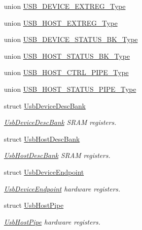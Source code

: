 \begin{DoxyCompactItemize}
\item 
union \hyperlink{union_u_s_b___d_e_v_i_c_e___e_x_t_r_e_g___type}{U\+S\+B\+\_\+\+D\+E\+V\+I\+C\+E\+\_\+\+E\+X\+T\+R\+E\+G\+\_\+\+Type}
\item 
union \hyperlink{union_u_s_b___h_o_s_t___e_x_t_r_e_g___type}{U\+S\+B\+\_\+\+H\+O\+S\+T\+\_\+\+E\+X\+T\+R\+E\+G\+\_\+\+Type}
\item 
union \hyperlink{union_u_s_b___d_e_v_i_c_e___s_t_a_t_u_s___b_k___type}{U\+S\+B\+\_\+\+D\+E\+V\+I\+C\+E\+\_\+\+S\+T\+A\+T\+U\+S\+\_\+\+B\+K\+\_\+\+Type}
\item 
union \hyperlink{union_u_s_b___h_o_s_t___s_t_a_t_u_s___b_k___type}{U\+S\+B\+\_\+\+H\+O\+S\+T\+\_\+\+S\+T\+A\+T\+U\+S\+\_\+\+B\+K\+\_\+\+Type}
\item 
union \hyperlink{union_u_s_b___h_o_s_t___c_t_r_l___p_i_p_e___type}{U\+S\+B\+\_\+\+H\+O\+S\+T\+\_\+\+C\+T\+R\+L\+\_\+\+P\+I\+P\+E\+\_\+\+Type}
\item 
union \hyperlink{union_u_s_b___h_o_s_t___s_t_a_t_u_s___p_i_p_e___type}{U\+S\+B\+\_\+\+H\+O\+S\+T\+\_\+\+S\+T\+A\+T\+U\+S\+\_\+\+P\+I\+P\+E\+\_\+\+Type}
\item 
struct \hyperlink{struct_usb_device_desc_bank}{Usb\+Device\+Desc\+Bank}
\begin{DoxyCompactList}\small\item\em \hyperlink{struct_usb_device_desc_bank}{Usb\+Device\+Desc\+Bank} S\+R\+A\+M registers. \end{DoxyCompactList}\item 
struct \hyperlink{struct_usb_host_desc_bank}{Usb\+Host\+Desc\+Bank}
\begin{DoxyCompactList}\small\item\em \hyperlink{struct_usb_host_desc_bank}{Usb\+Host\+Desc\+Bank} S\+R\+A\+M registers. \end{DoxyCompactList}\item 
struct \hyperlink{struct_usb_device_endpoint}{Usb\+Device\+Endpoint}
\begin{DoxyCompactList}\small\item\em \hyperlink{struct_usb_device_endpoint}{Usb\+Device\+Endpoint} hardware registers. \end{DoxyCompactList}\item 
struct \hyperlink{struct_usb_host_pipe}{Usb\+Host\+Pipe}
\begin{DoxyCompactList}\small\item\em \hyperlink{struct_usb_host_pipe}{Usb\+Host\+Pipe} hardware registers. \end{DoxyCompactList}\item 

\end{DoxyCompactItemize}
